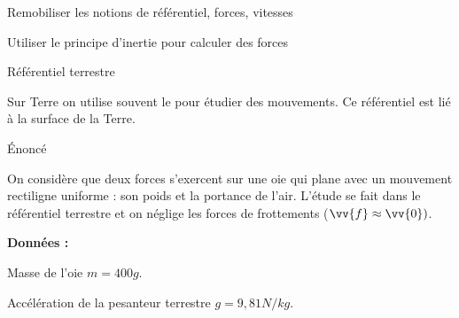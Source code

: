 \teteSndMouv




\begin{objectifs}
  \item Remobiliser les notions de référentiel, forces, vitesses
  \item Utiliser le principe d'inertie pour calculer des forces
\end{objectifs}


\begin{doc}{Référentiel terrestre}
  \vspace*{-24pt}
  \begin{encart}
     Sur Terre on utilise souvent le  pour étudier des mouvements. Ce référentiel est lié à la surface de la Terre.
  \end{encart}
\end{doc}


\vspace*{-12pt}

\vspace{-12pt}
\begin{doc}{Énoncé}
  \vspace*{-20pt}
  \begin{center}
  \end{center}
  
  
  On considère que deux forces s'exercent sur une oie qui plane avec un mouvement rectiligne uniforme : son poids et la portance de l'air.
  L'étude se fait dans le référentiel terrestre et on néglige les forces de frottements ($\vv{f} \approx \vv{0})$.

  \textbf{Données :}
  \begin{listePoints}
    \item Masse de l'oie $m = 400 \unit{g}$.
    \item Accélération de la pesanteur terrestre $g = 9,\!81 \unit{N/kg}$.
  \end{listePoints}
\end{doc}



